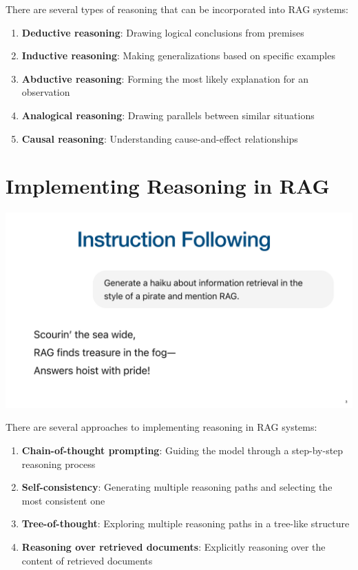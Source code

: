 \documentclass[
  letterpaper,
  oneside]{scrbook}
\providecommand{\tightlist}{%
  \setlength{\itemsep}{0pt}\setlength{\parskip}{0pt}}\usepackage{longtable,booktabs,array}
\begin{document}
There are several types of reasoning that can be incorporated into RAG
systems:

\begin{enumerate}
\def\labelenumi{\arabic{enumi}.}
\tightlist
\item
  \textbf{Deductive reasoning}: Drawing logical conclusions from
  premises
\item
  \textbf{Inductive reasoning}: Making generalizations based on specific
  examples
\item
  \textbf{Abductive reasoning}: Forming the most likely explanation for
  an observation
\item
  \textbf{Analogical reasoning}: Drawing parallels between similar
  situations
\item
  \textbf{Causal reasoning}: Understanding cause-and-effect
  relationships
\end{enumerate}

\section{Implementing Reasoning in
RAG}\label{implementing-reasoning-in-rag}

\includegraphics{chapters/../p3-images/slide_4.png}

There are several approaches to implementing reasoning in RAG systems:

\begin{enumerate}
\def\labelenumi{\arabic{enumi}.}
\tightlist
\item
  \textbf{Chain-of-thought prompting}: Guiding the model through a
  step-by-step reasoning process
\item
  \textbf{Self-consistency}: Generating multiple reasoning paths and
  selecting the most consistent one
\item
  \textbf{Tree-of-thought}: Exploring multiple reasoning paths in a
  tree-like structure
\item
  \textbf{Reasoning over retrieved documents}: Explicitly reasoning over
  the content of retrieved documents
\end{enumerate}
\end{document}

